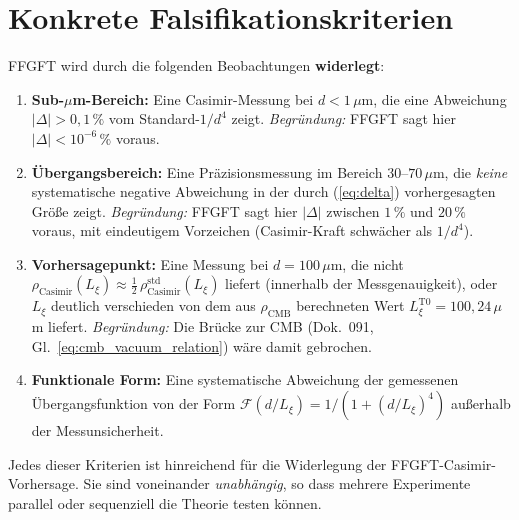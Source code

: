 \section{Konkrete Falsifikationskriterien}

FFGFT wird durch die folgenden Beobachtungen \textbf{widerlegt}:

\begin{enumerate}[leftmargin=2em,itemsep=4pt,topsep=2pt]
  \item \textbf{Sub-$\mu$m-Bereich:}
        Eine Casimir-Messung bei $d < 1\,\mu$m, die eine Abweichung
        $|\Delta| > 0{,}1\,\%$ vom Standard-$1/d^4$ zeigt.
        \emph{Begründung:} FFGFT sagt hier $|\Delta| < 10^{-6}\,\%$
        voraus.

  \item \textbf{Übergangsbereich:}
        Eine Präzisionsmessung im Bereich $30$--$70\,\mu$m, die
        \emph{keine} systematische negative Abweichung in der
        durch (\ref{eq:delta}) vorhergesagten Größe zeigt.
        \emph{Begründung:} FFGFT sagt hier $|\Delta|$ zwischen
        $1\,\%$ und $20\,\%$ voraus, mit eindeutigem Vorzeichen
        (Casimir-Kraft schwächer als $1/d^4$).

  \item \textbf{Vorhersagepunkt:}
        Eine Messung bei $d = 100\,\mu$m, die nicht
        $\rho_\text{Casimir}(L_\xi) \approx \frac{1}{2}\,
        \rho_\text{Casimir}^\text{std}(L_\xi)$ liefert
        (innerhalb der Messgenauigkeit), oder
        $L_\xi$ deutlich verschieden von dem aus
        $\rho_\text{CMB}$ berechneten Wert
        $L_\xi^\text{T0} = 100{,}24\,\mu$m liefert.
        \emph{Begründung:} Die Brücke zur CMB
        (Dok.~091, Gl.~\ref{eq:cmb_vacuum_relation})
        wäre damit gebrochen.

  \item \textbf{Funktionale Form:}
        Eine systematische Abweichung der gemessenen
        Übergangsfunktion von der Form
        $\mathcal{F}(d/L_\xi) = 1/(1 + (d/L_\xi)^4)$
        außerhalb der Messunsicherheit.
\end{enumerate}

Jedes dieser Kriterien ist hinreichend für die Widerlegung der
FFGFT-Casimir-Vorhersage. Sie sind voneinander \emph{unabhängig}, so
dass mehrere Experimente parallel oder sequenziell die Theorie
testen können.

